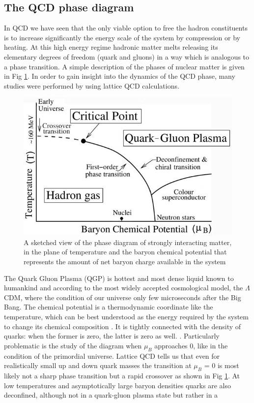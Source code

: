 \documentclass[12pt,a4paper]{book}
\begin{document}
	\subsection{The QCD phase diagram}
	In QCD we have seen that the only viable option to free the hadron constituents is to increase significantly the energy scale of the system by compression or by heating. At this high energy regime hadronic matter melts releasing its elementary degrees of freedom (quark and gluons) in a way which is analogous to a phase transition. A simple description of the phases of nuclear matter is given in Fig \ref{fig:QCD_phase_diagram}. In order to gain insight	into the dynamics of the QCD phase, many studies were performed by using lattice QCD	calculations. 
	\begin{figure}[ht]
		\centering
		\includegraphics[width=0.7\linewidth]{pictures/QCD_phase_diagram.jpg}
		\caption{A sketched view of the phase diagram of strongly interacting matter, in the plane of temperature and the baryon chemical potential that represents the amount of net baryon charge available in the system}
		\label{fig:QCD_phase_diagram} 
	\end{figure}
	The Quark Gluon Plasma (QGP) is hottest and most dense liquid known to humankind and according to the most widely accepted cosmological model, the $\Lambda$CDM, where the condition of our universe only few microseconds after the Big Bang. The chemical potential is a thermodynamic coordinate like the temperature, which can be best understood as the energy required by the system to change its chemical composition . It is tightly connected with the density of quarks: when the former is zero, the latter is zero as well. \cite{QCDPhase-Diagram}. Particularly problematic is the study of the diagram when $\mu_B$ approaches 0, like in the condition of the primordial universe. Lattice QCD tells us that even for realistically small up and down quark masses the transition at $\mu_B$ = 0 is most likely not a sharp phase transition but a rapid crossover as shown in Fig \ref{fig:QCD_phase_diagram}.  At low temperatures and asymptotically large baryon densities quarks are also deconfined, although not in a quark-gluon plasma state but rather in a
\end{document}
